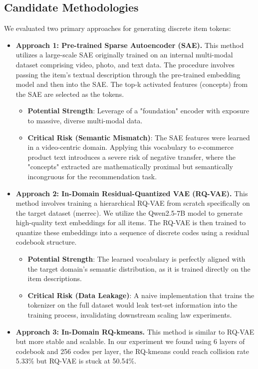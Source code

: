 \documentclass[]{fairmeta}
\begin{document}
\subsection{Candidate Methodologies}
We evaluated two primary approaches for generating discrete item tokens:
\begin{itemize}
    \item \textbf{Approach 1: Pre-trained Sparse Autoencoder (SAE).}
This method utilizes a large-scale SAE originally trained on an internal multi-modal dataset comprising video, photo, and text data. The procedure involves passing the item's textual description through the pre-trained embedding model and then into the SAE. The top-k activated features (concepts) from the SAE are selected as the tokens.
\begin{itemize}
    \item \textbf{Potential Strength}: Leverage of a "foundation" encoder with exposure to massive, diverse multi-modal data.
    \item \textbf{Critical Risk (Semantic Mismatch)}: The SAE features were learned in a video-centric domain. Applying this vocabulary to e-commerce product text introduces a severe risk of negative transfer, where the "concepts" extracted are mathematically proximal but semantically incongruous for the recommendation task.
\end{itemize}
\item \textbf{Approach 2: In-Domain Residual-Quantized VAE (RQ-VAE).}
This method involves training a hierarchical RQ-VAE from scratch specifically on the target dataset (merrec). We utilize the Qwen2.5-7B model to generate high-quality text embeddings for all items. The RQ-VAE is then trained to quantize these embeddings into a sequence of discrete codes using a residual codebook structure.
\begin{itemize}
    \item \textbf{Potential Strength}: The learned vocabulary is perfectly aligned with the target domain's semantic distribution, as it is trained directly on the item descriptions.
    \item \textbf{Critical Risk (Data Leakage)}: A naive implementation that trains the tokenizer on the full dataset would leak test-set information into the training process, invalidating downstream scaling law experiments.
\end{itemize}
\item  \textbf{Approach 3: In-Domain RQ-kmeans.}
This method is similar to RQ-VAE but more stable and scalable. In our experiment we found using 6 layers of codebook and 256 codes per layer, the RQ-kmeans could reach collision rate 5.33\% but RQ-VAE is stuck at 50.54\%.
\end{itemize}
\end{document}
